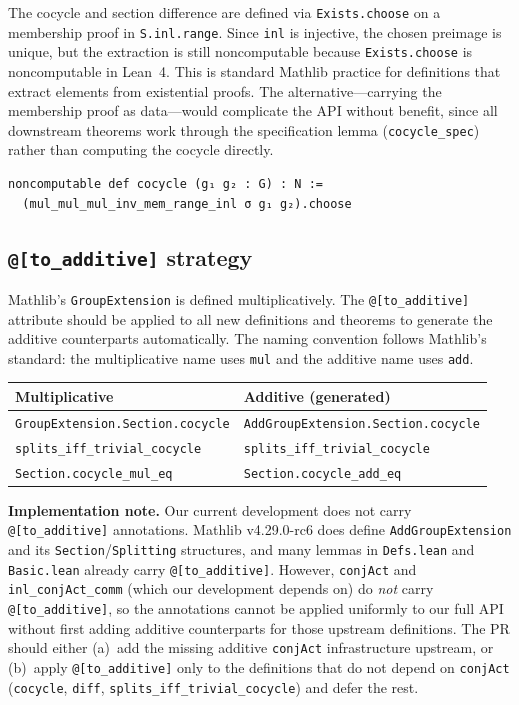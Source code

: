 \documentclass[11pt]{article}
\begin{document}
The cocycle and section difference are defined via \texttt{Exists.choose} on a
membership proof in \texttt{S.inl.range}. Since \texttt{inl} is injective, the chosen
preimage is unique, but the extraction is still noncomputable because
\texttt{Exists.choose} is noncomputable in Lean~4. This is standard Mathlib practice
for definitions that extract elements from existential proofs. The alternative---carrying
the membership proof as data---would complicate the API without benefit, since all
downstream theorems work through the specification lemma (\texttt{cocycle\_spec}) rather
than computing the cocycle directly.

\begin{lstlisting}
noncomputable def cocycle (g₁ g₂ : G) : N :=
  (mul_mul_mul_inv_mem_range_inl σ g₁ g₂).choose
\end{lstlisting}

\subsection{\texttt{@[to\_additive]} strategy}\label{sec:to-additive}

Mathlib's \texttt{GroupExtension} is defined multiplicatively. The \texttt{@[to\_additive]}
attribute should be applied to all new definitions and theorems to generate the additive
counterparts automatically. The naming convention follows Mathlib's standard: the
multiplicative name uses \texttt{mul} and the additive name uses \texttt{add}.

\begin{center}
\begin{tabular}{ll}
\toprule
\textbf{Multiplicative} & \textbf{Additive (generated)} \\
\midrule
\texttt{GroupExtension.Section.cocycle} & \texttt{AddGroupExtension.Section.cocycle} \\
\texttt{splits\_iff\_trivial\_cocycle} & \texttt{splits\_iff\_trivial\_cocycle} \\
\texttt{Section.cocycle\_mul\_eq} & \texttt{Section.cocycle\_add\_eq} \\
\bottomrule
\end{tabular}
\end{center}

\textbf{Implementation note.} Our current development does not carry
\texttt{@[to\_additive]} annotations. Mathlib v4.29.0-rc6 does define
\texttt{AddGroupExtension} and its \texttt{Section}/\texttt{Splitting} structures, and
many lemmas in \texttt{Defs.lean} and \texttt{Basic.lean} already carry
\texttt{@[to\_additive]}. However, \texttt{conjAct} and \texttt{inl\_conjAct\_comm}
(which our development depends on) do \emph{not} carry \texttt{@[to\_additive]}, so
the annotations cannot be applied uniformly to our full API without first adding
additive counterparts for those upstream definitions. The PR should either (a)~add the
missing additive \texttt{conjAct} infrastructure upstream, or (b)~apply
\texttt{@[to\_additive]} only to the definitions that do not depend on \texttt{conjAct}
(\texttt{cocycle}, \texttt{diff}, \texttt{splits\_iff\_trivial\_cocycle}) and defer the
rest.
\end{document}
